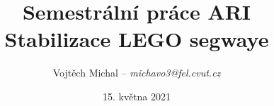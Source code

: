 \documentclass{beamer}
\title[ARI: Stabilizace LEGO segwaye]{Semestrální práce ARI\\ Stabilizace LEGO segwaye} %
\author{Vojtěch Michal -- 
\textit{michavo3@fel.cvut.cz}} %
\date{15. května 2021}
\begin{document}
\begin{frame}
\titlepage
\end{frame}

\begin{frame}
\end{frame}
\end{document}

